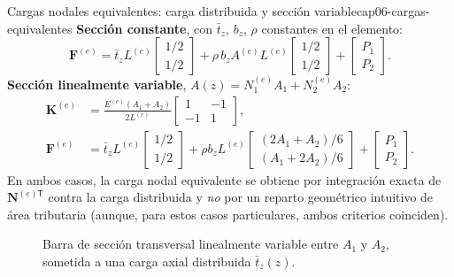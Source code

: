 \begin{ecnimportante}{Cargas nodales equivalentes: carga distribuida y sección variable}{cap06-cargas-equivalentes}
\textbf{Sección constante}, con $\bar t_z$, $b_z$, $\rho$ constantes en el elemento:
\[
\bm F^{(e)} = \bar t_z L^{(e)} \begin{bmatrix} 1/2 \\ 1/2 \end{bmatrix} + \rho\, b_z A^{(e)} L^{(e)} \begin{bmatrix} 1/2 \\ 1/2 \end{bmatrix} + \begin{bmatrix} P_1 \\ P_2 \end{bmatrix} .
\]
\textbf{Sección linealmente variable}, $A(z)=N_1^{(e)}A_1+N_2^{(e)}A_2$:
\begin{align*}
\bm K^{(e)} &= \frac{E^{(e)}(A_1+A_2)}{2L^{(e)}}\begin{bmatrix}1&-1\\-1&1\end{bmatrix}, \\
\bm F^{(e)} &= \bar t_z L^{(e)}\begin{bmatrix}1/2\\1/2\end{bmatrix} + \rho b_z L^{(e)} \begin{bmatrix} (2A_1+A_2)/6 \\ (A_1+2A_2)/6 \end{bmatrix} + \begin{bmatrix}P_1\\P_2\end{bmatrix} .
\end{align*}
En ambos casos, la carga nodal equivalente se obtiene por integración exacta de $\bm N^{(e)\mathsf T}$ contra la carga distribuida y \emph{no} por un reparto geométrico intuitivo de área tributaria (aunque, para estos casos particulares, ambos criterios coinciden).
\end{ecnimportante}

\begin{figure}[htbp]
\centering
{}
\caption{Barra de sección transversal linealmente variable entre $A_1$ y $A_2$, sometida a una carga axial distribuida $\bar t_z(z)$.}
\label{fig:cap06-barra-seccion-variable}
\end{figure}

